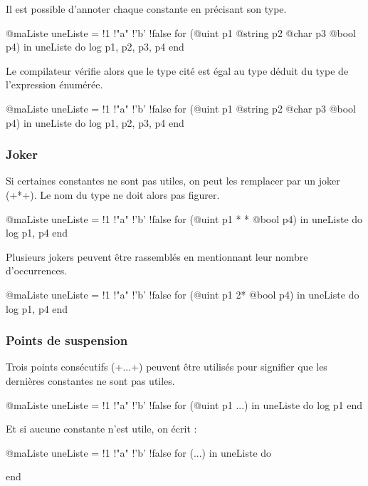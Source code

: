 Il est possible d'annoter chaque constante en précisant son type.

\begin{galgas}
@maListe uneListe = {!1 !"a" !'b' !false}
for (@uint p1 @string p2 @char p3 @bool p4) in uneListe do
  log p1, p2, p3, p4
end
\end{galgas}

Le compilateur vérifie alors que le type cité est égal au type déduit du type de l'expression énumérée.
\begin{galgas}
@maListe uneListe = {!1 !"a" !'b' !false}
for (@uint p1 @string p2 @char p3 @bool p4) in uneListe do
  log p1, p2, p3, p4
end
\end{galgas}


\subsubsection{Joker}

Si certaines constantes ne sont pas utiles, on peut les remplacer par un joker (\ggs+*+). Le nom du type ne doit alors pas figurer.
\begin{galgas}
@maListe uneListe = {!1 !"a" !'b' !false}
for (@uint p1 * * @bool p4) in uneListe do
  log p1, p4
end
\end{galgas}

Plusieurs jokers peuvent être rassemblés en mentionnant leur nombre d'occurrences.
\begin{galgas}
@maListe uneListe = {!1 !"a" !'b' !false}
for (@uint p1 2* @bool p4) in uneListe do
  log p1, p4
end
\end{galgas}



\subsubsection{Points de suspension}

Trois points consécutifs (\ggs+...+) peuvent être utilisés pour signifier que les dernières constantes ne sont pas utiles.

\begin{galgas}
@maListe uneListe = {!1 !"a" !'b' !false}
for (@uint p1 ...) in uneListe do
  log p1
end
\end{galgas}

Et si aucune constante n'est utile, on écrit :
\begin{galgas}
@maListe uneListe = {!1 !"a" !'b' !false}
for (...) in uneListe do

end
\end{galgas}






